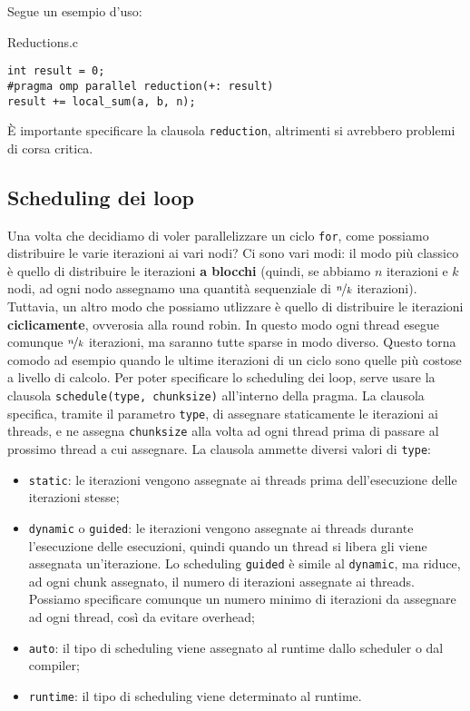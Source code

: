 Segue un esempio d'uso:

\begin{codeblock}{Reductions.c}
    \begin{lstlisting}[langauge = c]
int result = 0;
#pragma omp parallel reduction(+: result)
result += local_sum(a, b, n);\end{lstlisting}
\end{codeblock}

È importante specificare la clausola \verb|reduction|, altrimenti si avrebbero problemi di corsa critica.


\subsection{Scheduling dei loop}

Una volta che decidiamo di voler parallelizzare un ciclo \verb|for|, come possiamo distribuire le varie iterazioni ai vari nodi? Ci sono vari modi: il modo più classico è quello di distribuire le iterazioni \textbf{a blocchi} (quindi, se abbiamo $n$ iterazioni e $k$ nodi, ad ogni nodo assegnamo una quantità sequenziale di $\nicefrac{n}{k}$ iterazioni). Tuttavia, un altro modo che possiamo utlizzare è quello di distribuire le iterazioni \textbf{ciclicamente}, ovverosia alla round robin. In questo modo ogni thread esegue comunque $\nicefrac{n}{k}$ iterazioni, ma saranno tutte sparse in modo diverso. Questo torna comodo ad esempio quando le ultime iterazioni di un ciclo sono quelle più costose a livello di calcolo.
\nl
Per poter specificare lo scheduling dei loop, serve usare la clausola \verb|schedule(type, chunksize)| all'interno della pragma. La clausola specifica, tramite il parametro \verb|type|, di assegnare staticamente le iterazioni ai threads, e ne assegna \verb|chunksize| alla volta ad ogni thread prima di passare al prossimo thread a cui assegnare.
\nl
La clausola ammette diversi valori di \verb|type|:
\begin{itemize}
    \item \verb|static|: le iterazioni vengono assegnate ai threads prima dell'esecuzione delle iterazioni stesse;
    \item \verb|dynamic| o \verb|guided|: le iterazioni vengono assegnate ai threads durante l'esecuzione delle esecuzioni, quindi quando un thread si libera gli viene assegnata un'iterazione. Lo scheduling \verb|guided| è simile al \verb|dynamic|, ma riduce, ad ogni chunk assegnato, il numero di iterazioni assegnate ai threads. Possiamo specificare comunque un numero minimo di iterazioni da assegnare ad ogni thread, così da evitare overhead;
    \item \verb|auto|: il tipo di scheduling viene assegnato al runtime dallo scheduler o dal compiler;
    \item \verb|runtime|: il tipo di scheduling viene determinato al runtime.
\end{itemize}

